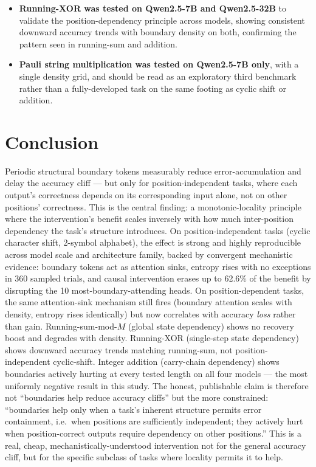 \documentclass[11pt]{article}
\begin{document}
\begin{itemize}
\item \textbf{Running-XOR was tested on Qwen2.5-7B and Qwen2.5-32B} to validate the position-dependency principle across models, showing consistent downward accuracy trends with boundary density on both, confirming the pattern seen in running-sum and addition.
\item \textbf{Pauli string multiplication was tested on Qwen2.5-7B only}, with a single density grid, and should be read as an exploratory third benchmark rather than a fully-developed task on the same footing as cyclic shift or addition.
\end{itemize}

\section{Conclusion}

Periodic structural boundary tokens measurably reduce error-accumulation and delay the accuracy cliff --- but only for position-independent tasks, where each output's correctness depends on its corresponding input alone, not on other positions' correctness. This is the central finding: a monotonic-locality principle where the intervention's benefit scales inversely with how much inter-position dependency the task's structure introduces. On position-independent tasks (cyclic character shift, 2-symbol alphabet), the effect is strong and highly reproducible across model scale and architecture family, backed by convergent mechanistic evidence: boundary tokens act as attention sinks, entropy rises with no exceptions in 360 sampled trials, and causal intervention erases up to 62.6\% of the benefit by disrupting the 10 most-boundary-attending heads. On position-dependent tasks, the same attention-sink mechanism still fires (boundary attention scales with density, entropy rises identically) but now correlates with accuracy \emph{loss} rather than gain. Running-sum-mod-$M$ (global state dependency) shows no recovery boost and degrades with density. Running-XOR (single-step state dependency) shows downward accuracy trends matching running-sum, not position-independent cyclic-shift. Integer addition (carry-chain dependency) shows boundaries actively hurting at every tested length on all four models --- the most uniformly negative result in this study. The honest, publishable claim is therefore not ``boundaries help reduce accuracy cliffs'' but the more constrained: ``boundaries help only when a task's inherent structure permits error containment, i.e.\ when positions are sufficiently independent; they actively hurt when position-correct outputs require dependency on other positions.'' This is a real, cheap, mechanistically-understood intervention not for the general accuracy cliff, but for the specific subclass of tasks where locality permits it to help.
\end{document}

